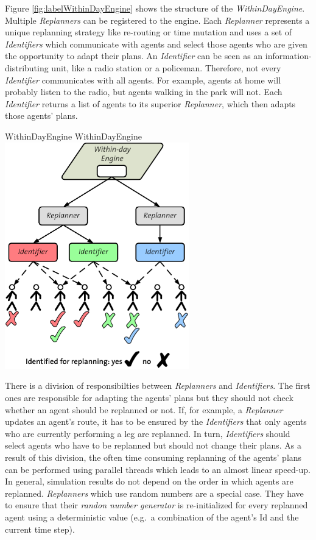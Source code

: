 Figure \ref{fig:labelWithinDayEngine} shows the structure of the \emph{WithinDayEngine}. Multiple \emph{Replanners} can be registered to the engine. Each \emph{Replanner} represents a unique replanning strategy like re-routing or time mutation and uses a set of \emph{Identifiers} which communicate with agents and select those agents who are given the opportunity to adapt their plans. An \emph{Identifier} can be seen as an information-distributing unit, like a radio station or a policeman. Therefore, not every \emph{Identifier} communicates with all agents. For example, agents at home will probably listen to the radio, but agents walking in the park will not. Each \emph{Identifier} returns a list of agents to its superior \emph{Replanner}, which then adapts those agents' plans.

\createfigure%
{WithinDayEngine}%
{WithinDayEngine}%
{\label{fig:labelWithinDayEngine}}%
{\includegraphics[width=8.0cm, angle=0]{extending/figures/WithinDayReplanning/ReplanningManager}}%
{}

There is a division of responsibilties between \emph{Replanners} and \emph{Identifiers}. The first ones are responsible for adapting the agents' plans but they should not check whether an agent should be replanned or not. If, for example, a \emph{Replanner} updates an agent's route, it has to be ensured by the \emph{Identifiers} that only agents who are currently performing a leg are replanned. In turn, \emph{Identifiers} should select agents who have to be replanned but should not change their plans. As a result of this division, the often time consuming replanning of the agents' plans can be performed using parallel threads which leads to an almost linear speed-up. In general, simulation results do not depend on the order in which agents are replanned. \emph{Replanners} which use random numbers are a special case. They have to ensure that their \emph{randon number generator} is re-initialized for every replanned agent using a deterministic value (e.g.~a combination of the agent's Id and the current time step).

